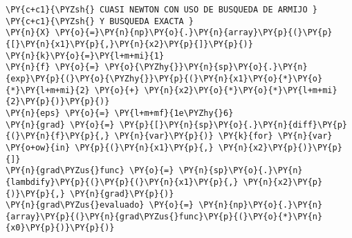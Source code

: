 \begin{itemize}
\begin{tcolorbox}[breakable, size=fbox, boxrule=1pt, pad at break*=1mm,colback=cellbackground, colframe=cellborder]
\begin{Verbatim}[commandchars=\\\{\}]
\PY{c+c1}{\PYZsh{} CUASI NEWTON CON USO DE BUSQUEDA DE ARMIJO }
\PY{c+c1}{\PYZsh{} Y BUSQUEDA EXACTA }
\PY{n}{X} \PY{o}{=}\PY{n}{np}\PY{o}{.}\PY{n}{array}\PY{p}{(}\PY{p}{[}\PY{n}{x1}\PY{p}{,}\PY{n}{x2}\PY{p}{]}\PY{p}{)}
\PY{n}{k}\PY{o}{=}\PY{l+m+mi}{1}
\PY{n}{f} \PY{o}{=} \PY{o}{\PYZhy{}}\PY{n}{sp}\PY{o}{.}\PY{n}{exp}\PY{p}{(}\PY{o}{\PYZhy{}}\PY{p}{(}\PY{n}{x1}\PY{o}{*}\PY{o}{*}\PY{l+m+mi}{2} \PY{o}{+} \PY{n}{x2}\PY{o}{*}\PY{o}{*}\PY{l+m+mi}{2}\PY{p}{)}\PY{p}{)}
\PY{n}{eps} \PY{o}{=} \PY{l+m+mf}{1e\PYZhy{}6}
\PY{n}{grad} \PY{o}{=} \PY{p}{[}\PY{n}{sp}\PY{o}{.}\PY{n}{diff}\PY{p}{(}\PY{n}{f}\PY{p}{,} \PY{n}{var}\PY{p}{)} \PY{k}{for} \PY{n}{var} \PY{o+ow}{in} \PY{p}{(}\PY{n}{x1}\PY{p}{,} \PY{n}{x2}\PY{p}{)}\PY{p}{]}
\PY{n}{grad\PYZus{}func} \PY{o}{=} \PY{n}{sp}\PY{o}{.}\PY{n}{lambdify}\PY{p}{(}\PY{p}{(}\PY{n}{x1}\PY{p}{,} \PY{n}{x2}\PY{p}{)}\PY{p}{,} \PY{n}{grad}\PY{p}{)}
\PY{n}{grad\PYZus{}evaluado} \PY{o}{=} \PY{n}{np}\PY{o}{.}\PY{n}{array}\PY{p}{(}\PY{n}{grad\PYZus{}func}\PY{p}{(}\PY{o}{*}\PY{n}{x0}\PY{p}{)}\PY{p}{)}


\end{Verbatim}
\end{tcolorbox}
\end{itemize}
